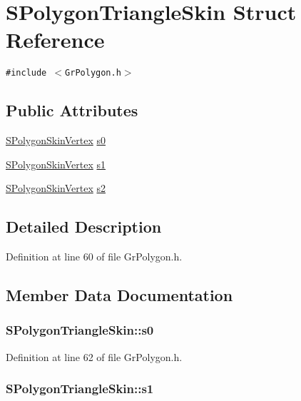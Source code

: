 \hypertarget{struct_s_polygon_triangle_skin}{
\section{SPolygonTriangleSkin Struct Reference}
\label{struct_s_polygon_triangle_skin}
}
{\tt \#include $<$GrPolygon.h$>$}

\subsection*{Public Attributes}
\begin{CompactItemize}
\item 
\hyperlink{struct_s_polygon_skin_vertex}{SPolygonSkinVertex} \hyperlink{struct_s_polygon_triangle_skin_00bcc97032451ccc8b9b9338fb3af4d1}{s0}
\item 
\hyperlink{struct_s_polygon_skin_vertex}{SPolygonSkinVertex} \hyperlink{struct_s_polygon_triangle_skin_14c2cf1dc5d2d43cd9d8bc211622df5b}{s1}
\item 
\hyperlink{struct_s_polygon_skin_vertex}{SPolygonSkinVertex} \hyperlink{struct_s_polygon_triangle_skin_07085347994b8e5a9772267305b72c19}{s2}
\end{CompactItemize}


\subsection{Detailed Description}


Definition at line 60 of file GrPolygon.h.

\subsection{Member Data Documentation}
\hypertarget{struct_s_polygon_triangle_skin_00bcc97032451ccc8b9b9338fb3af4d1}{
\subsubsection[{s0}]{ {\bf SPolygonTriangleSkin::s0}}}
\label{struct_s_polygon_triangle_skin_00bcc97032451ccc8b9b9338fb3af4d1}




Definition at line 62 of file GrPolygon.h.\hypertarget{struct_s_polygon_triangle_skin_14c2cf1dc5d2d43cd9d8bc211622df5b}{
\subsubsection[{s1}]{ {\bf SPolygonTriangleSkin::s1}}}
\label{struct_s_polygon_triangle_skin_14c2cf1dc5d2d43cd9d8bc211622df5b}




